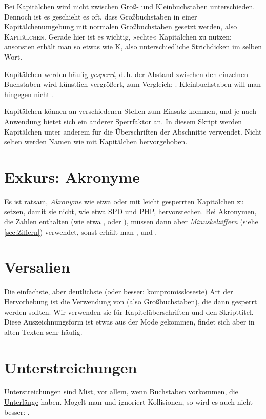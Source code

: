 Bei Kapitälchen wird nicht zwischen Groß- und Kleinbuchstaben
unterschieden. Dennoch ist es geschieht es oft, dass Großbuchstaben in einer
Kapitälchenumgebung mit normalen Großbuchstaben gesetzt werden, also
\textsc{Kapitälchen}. Gerade hier ist es wichtig, »echte« Kapitälchen zu
nutzen; ansonsten erhält man so etwas wie K, also
unterschiedliche Strichdicken im selben Wort.

Kapitälchen werden häufig \emph{gesperrt}, d.\,h. der Abstand zwischen den
einzelnen Buchstaben wird künstlich vergrößert, zum Vergleich:
. Kleinbuchstaben will man hingegen nicht
.

Kapitälchen können an verschiedenen Stellen zum Einsatz kommen, und je nach
Anwendung bietet sich ein anderer Sperrfaktor an. In diesem Skript werden
Kapitälchen unter anderem für die Überschriften der Abschnitte verwendet. Nicht
selten werden Namen wie  mit
Kapitälchen hervorgehoben.

\section{Exkurs: Akronyme}

Es ist ratsam, \emph{Akronyme} wie etwa  oder  mit leicht
gesperrten Kapitälchen zu setzen, damit sie nicht, wie etwa SPD und PHP,
hervorstechen. Bei Akronymen, die Zahlen enthalten (wie etwa ,
 oder ), müssen dann aber
\emph{Minuskelziffern} (siehe \cref{sec:Ziffern}) verwendet, sonst erhält man
,  und
.

\section{Versalien}

Die einfachste, aber deutlichste (oder besser: kompromissloseste) Art
der Hervorhebung ist die Verwendung von  (also
Großbuchstaben), die dann gesperrt werden sollten. Wir verwenden sie für
Kapitelüberschriften und den Skripttitel.  Diese Auszeichnungsform ist etwas aus
der Mode gekommen, findet sich aber in alten Texten sehr häufig.

\section{Unterstreichungen}

Unterstreichungen sind \underline{Mist}, vor allem, wenn Buchstaben vorkommen,
die \underline{Unterlänge} haben. Mogelt man und ignoriert Kollisionen, so wird
es auch nicht besser: \underline{}.



